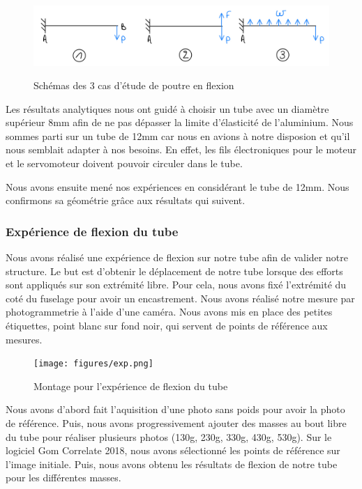 \documentclass[a4paper,12pt,french]{report}
\begin{document}
\begin{figure}[h]
    \centering
    \includegraphics[height=3cm]{figures/flexion.jpeg}
    \caption{Schémas des 3 cas d'étude de poutre en flexion}
    \label{flex}
\end{figure}

Les résultats analytiques nous ont guidé à choisir un tube avec un diamètre supérieur 8mm afin de ne pas dépasser la limite d'élasticité de l'aluminium. Nous sommes parti sur un tube de 12mm car nous en avions à notre disposion et qu'il nous semblait adapter à nos besoins. En effet, les fils électroniques pour le moteur et le servomoteur doivent pouvoir circuler dans le tube.\newline

Nous avons ensuite mené nos expériences en considérant le tube de 12mm. Nous confirmons sa géométrie grâce aux résultats qui suivent.

\subsubsection{Expérience de flexion du tube}

Nous avons réalisé une expérience de flexion sur notre tube afin de valider notre structure. Le but est d'obtenir le déplacement de notre tube lorsque des efforts sont appliqués sur son extrémité libre. Pour cela, nous avons fixé l'extrémité du coté du fuselage pour avoir un encastrement. Nous avons réalisé notre mesure par photogrammetrie à l'aide d'une caméra. Nous avons mis en place des petites étiquettes, point blanc sur fond noir, qui servent de points de référence aux mesures.\newline
\begin{figure}[h]
    \centering
    \texttt{[image: figures/exp.png]}
    \caption{Montage pour l'expérience de flexion du tube}
    \label{mont}
\end{figure}
\newpage

Nous avons d'abord fait l'aquisition d'une photo sans poids pour avoir la photo de référence. Puis, nous avons progressivement ajouter des masses au bout libre du tube pour réaliser plusieurs photos (130g, 230g, 330g, 430g, 530g).  Sur le logiciel Gom Correlate 2018, nous avons sélectionné les points de référence sur l'image initiale. Puis, nous avons obtenu les résultats de flexion de notre tube pour les différentes masses.\newline
\end{document}
